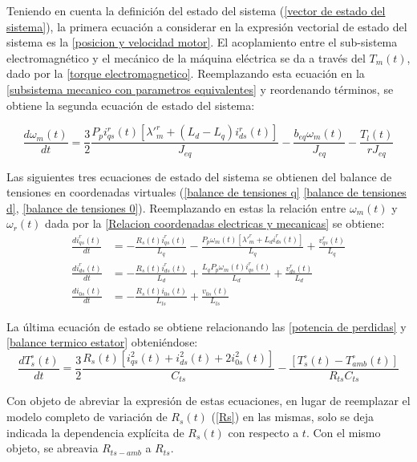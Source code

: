 \documentclass[a4paper, 10pt, onecolumn,journal]{ieeeconf}
\begin{document}
Teniendo en cuenta la definición del estado del sistema (\cref{vector de estado del sistema}), la primera ecuación a considerar en la expresión vectorial de estado del sistema es la
\cref{posicion y velocidad motor}. El acoplamiento entre el sub-sistema electromagnético y el
mecánico de la máquina eléctrica se da a través del $T_m(t)$, dado por la \cref{torque electromagnetico}.
Reemplazando esta ecuación en la \cref{subsistema mecanico con parametros equivalentes} y reordenando términos,
se obtiene la segunda ecuación de estado del sistema:

\begin{equation}
    \frac{d \omega_m(t)}{dt} = \frac{3}{2} \frac{P_p i^r_{qs}(t)\left[\lambda'^r_m + (L_d - L_q) i^r_{ds}(t) \right]}{J_{eq}} - \frac{b_{eq}\omega_m(t)}{J_{eq}} - \frac{T_l(t)}{r J_{eq}}
    \label{ecuacion de estado wm}
\end{equation}

Las siguientes tres ecuaciones de estado del sistema se obtienen del balance de tensiones
en coordenadas virtuales (\cref{balance de tensiones q} \cref{balance de tensiones d}, \cref{balance de tensiones 0}).
Reemplazando en estas la relación entre $\omega_m(t)$ y $\omega_r(t)$ dada por la \cref{Relacion coordenadas electricas y mecanicas} se obtiene:
\begin{align}
    \frac{d i^r_{qs}(t)}{dt} &= -\frac{R_s(t) i^r_{qs}(t)}{L_q} - \frac{P_p \omega_m(t) \left[\lambda'^r_m + L_d i^r_{ds}(t)\right]}{L_q} + \frac{v^r_{qs}(t)}{L_q} \label{ecuacion de estado iqs}\\
    \frac{d i^r_{ds}(t)}{dt} &= -\frac{R_s(t) i^r_{ds}(t)}{L_d} + \frac{L_q P_p \omega_m(t)i^r_{qs}(t)}{L_d}  + \frac{v^r_{ds}(t)}{L_d} \label{ecuacion de estado ids}\\ 
    \frac{d i_{0s}(t)}{dt}   &= -\frac{R_s(t) i_{0s}(t)}{L_{ls}} + \frac{v_{0s}(t)}{L_{ls}}\label{ecuacion de estado i0s}
\end{align}

La última ecuación de estado se obtiene relacionando las \cref{potencia de perdidas} y \cref{balance termico estator} obteniéndose:
\begin{equation}
    \frac{d T^\circ_s(t)}{dt} = \frac{3}{2} \frac{R_s(t) \left[ i_{qs}^2(t) + i_{ds}^2(t) + 2 i_{0s}^2(t) \right]}{C_{ts}} - \frac{\left[T_s^{\circ}(t) - T_{amb}^{\circ}(t)\right]}{R_{ts}C_{ts}} 
    \label{ecuacion de estado Ts}
\end{equation}

Con objeto de abreviar la expresión de estas ecuaciones, en lugar de reemplazar el modelo completo de variación de $R_s(t)$ (\cref{Rs}) en las mismas, 
solo se deja indicada la dependencia explícita de $R_s(t)$ con respecto a $t$. Con el mismo objeto, se abreavia $R_{ts-amb}$ a $R_{ts}$.
\end{document}
